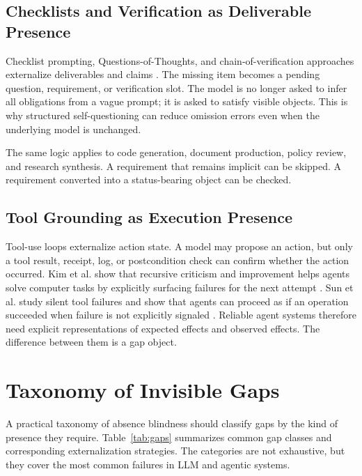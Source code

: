 \documentclass[10pt,conference]{IEEEtran}
\begin{document}
\subsection{Checklists and Verification as Deliverable Presence}
Checklist prompting, Questions-of-Thoughts, and chain-of-verification approaches externalize deliverables and claims \cite{liu2026qot,he2024cov}. The missing item becomes a pending question, requirement, or verification slot. The model is no longer asked to infer all obligations from a vague prompt; it is asked to satisfy visible objects. This is why structured self-questioning can reduce omission errors even when the underlying model is unchanged.

The same logic applies to code generation, document production, policy review, and research synthesis. A requirement that remains implicit can be skipped. A requirement converted into a status-bearing object can be checked.

\subsection{Tool Grounding as Execution Presence}
Tool-use loops externalize action state. A model may propose an action, but only a tool result, receipt, log, or postcondition check can confirm whether the action occurred. Kim et al. show that recursive criticism and improvement helps agents solve computer tasks by explicitly surfacing failures for the next attempt \cite{kim2023computer}. Sun et al. study silent tool failures and show that agents can proceed as if an operation succeeded when failure is not explicitly signaled \cite{sun2024tools}. Reliable agent systems therefore need explicit representations of expected effects and observed effects. The difference between them is a gap object.

\section{Taxonomy of Invisible Gaps}
A practical taxonomy of absence blindness should classify gaps by the kind of presence they require. Table~\ref{tab:gaps} summarizes common gap classes and corresponding externalization strategies. The categories are not exhaustive, but they cover the most common failures in LLM and agentic systems.
\end{document}
